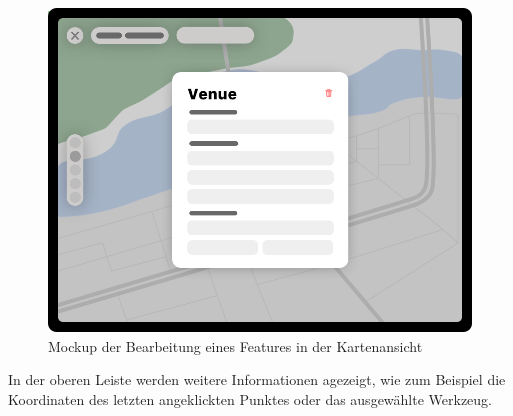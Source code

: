 \begin{figure}[h!]
	\centering
	\vspace{15pt}
	\includegraphics[scale=0.4]{images/design-map-edit}
	\caption{Mockup der Bearbeitung eines Features in der Kartenansicht}
	\label{fig:design-map-edit}
\end{figure}
In der oberen Leiste werden weitere Informationen agezeigt, wie zum Beispiel die Koordinaten des letzten angeklickten Punktes oder das ausgewählte Werkzeug.

